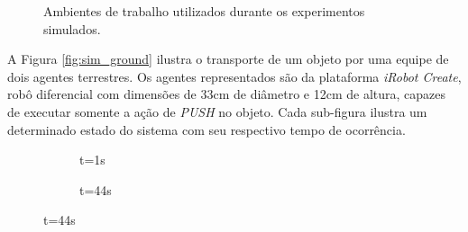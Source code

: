 \begin{figure}[h]
  \caption{Ambientes de trabalho utilizados durante os experimentos simulados.}
  \label{fig:maps}

\end{figure}

A Figura \ref{fig:sim_ground} ilustra o transporte de um objeto por uma equipe de dois agentes terrestres. Os agentes representados são da plataforma \emph{iRobot Create}, robô diferencial com dimensões de 33cm de diâmetro e 12cm de altura, capazes de executar somente a ação de \emph{PUSH} no objeto.
Cada sub-figura ilustra um determinado estado do sistema com seu respectivo tempo de ocorrência.

\begin{figure}[ht!]
  \centering
  \setlength{\fboxsep}{0pt}

  \begin{subfigure}[t]{0.45\textwidth}
    \centering
    \caption{t=1s}
    \label{fig:sim_1}
  \end{subfigure}
  \hspace{0.2cm}
  \begin{subfigure}[t]{0.45\textwidth}
    \centering
    \caption{t=44s}
    \label{fig:sim_44}
  \end{subfigure}


\end{figure}
